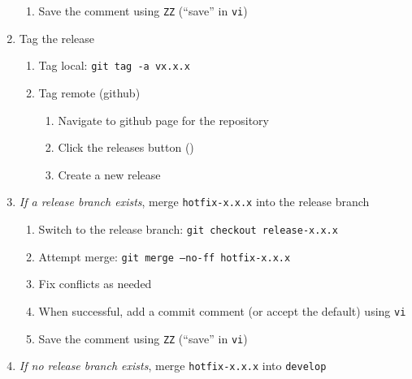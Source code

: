\documentclass{article}
\begin{document}
\begin{enumerate}
\begin{enumerate}
	\item Save the comment using \texttt{ZZ} (``save'' in \texttt{vi})

  \end{enumerate}
  \item Tag the release
  \begin{enumerate}

    \item Tag local: \texttt{git tag -a vx.x.x}

    \item Tag remote (github)
	\begin{enumerate}

	  \item Navigate to github page for the repository

	  \item Click the releases button ()
	  
	  \item Create a new release

	\end{enumerate}
  \end{enumerate}
  
  \item \emph{If a release branch exists}, 
  		merge \texttt{hotfix-x.x.x} into the release branch
  \begin{enumerate}

    \item Switch to the release branch: \texttt{git checkout release-x.x.x} 

    \item Attempt merge: \texttt{git merge --no-ff hotfix-x.x.x}
	
	\item Fix conflicts as needed
	
	\item When successful, add a commit comment (or accept the default) using \texttt{vi} 
	
	\item Save the comment using \texttt{ZZ} (``save'' in \texttt{vi})

  \end{enumerate}
  \item \emph{If no release branch exists}, merge \texttt{hotfix-x.x.x} into \texttt{develop} 
  \begin{enumerate}


\end{enumerate}
\end{enumerate}
\end{document}
